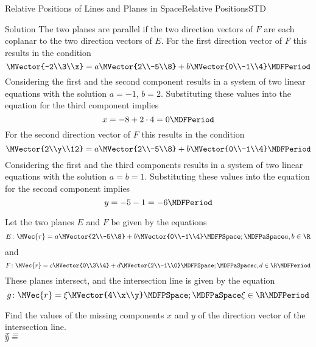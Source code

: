 \begin{MXContent}{Relative Positions of Lines and Planes in Space}{Relative Positions}{STD}
\begin{MExercise}
\begin{MHint}{Solution}
The two planes are parallel if the two direction vectors of $F$ are each coplanar to the two 
direction vectors of $E$. For the first direction vector of $F$ this results in the condition
\[
 \MVector{-2\\3\\x}=a\MVector{2\\-5\\8}+b\MVector{0\\-1\\4} \MDFPeriod
\]
Considering the first and the second component results in a system of two linear equations with the solution 
$a=-1$, $b=2$. Substituting these values into the equation for the third component implies
\[
 x=-8+2\cdot 4=0\MDFPeriod
\]
For the second direction vector of $F$ this results in the condition 
\[
 \MVector{2\\y\\12}=a\MVector{2\\-5\\8}+b\MVector{0\\-1\\4} \MDFPeriod
\]
Considering the first and the third components results in a system of two linear equations with the solution
$a=b=1$. Substituting these values into the equation for the second component implies
\[
 y=-5-1=-6\MDFPeriod
\]
\end{MHint}


\end{MExercise}

\begin{MExercise}
Let the two planes $E$ and $F$ be given by the equations
\[
 E\colon\MVec{r}=a\MVector{2\\-5\\8}+b\MVector{0\\-1\\4}\MDFPSpace;\MDFPaSpace a,b\in\R
\]
and
\[
 F\colon\MVec{r}=c\MVector{0\\3\\4}+d\MVector{2\\-1\\0}\MDFPSpace;\MDFPaSpace c,d\in\R\MDFPeriod
\]
These planes intersect, and the intersection line is given by the equation
\[
 g\colon\MVec{r}=\xi\MVector{4\\x\\y}\MDFPSpace;\MDFPaSpace \xi\in\R \MDFPeriod 
\]

Find the values of the missing components $x$ and $y$ of the direction vector of the intersection line.\\
$x=$\\
$y=$


\end{MExercise}
\end{MXContent}
